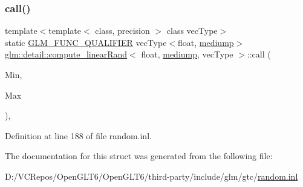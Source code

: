 \subsubsection{\texorpdfstring{call()}{call()}}
{\footnotesize\ttfamily template$<$template$<$ class, precision $>$ class vec\+Type$>$ \\
static \mbox{\hyperlink{setup_8hpp_a33fdea6f91c5f834105f7415e2a64407}{G\+L\+M\+\_\+\+F\+U\+N\+C\+\_\+\+Q\+U\+A\+L\+I\+F\+I\+ER}} vec\+Type$<$float, \mbox{\hyperlink{namespaceglm_a0f04f086094c747d227af4425893f545a6416f3ea0c9025fb21ed50c4d6620482}{mediump}}$>$ \mbox{\hyperlink{structglm_1_1detail_1_1compute__linear_rand}{glm\+::detail\+::compute\+\_\+linear\+Rand}}$<$ float, \mbox{\hyperlink{namespaceglm_a0f04f086094c747d227af4425893f545a6416f3ea0c9025fb21ed50c4d6620482}{mediump}}, vec\+Type $>$\+::call (\begin{DoxyParamCaption}\item[{vec\+Type$<$ float, \mbox{\hyperlink{namespaceglm_a0f04f086094c747d227af4425893f545a6416f3ea0c9025fb21ed50c4d6620482}{mediump}} $>$ const \&}]{Min,  }\item[{vec\+Type$<$ float, \mbox{\hyperlink{namespaceglm_a0f04f086094c747d227af4425893f545a6416f3ea0c9025fb21ed50c4d6620482}{mediump}} $>$ const \&}]{Max }\end{DoxyParamCaption})\hspace{0.3cm}{\ttfamily [inline]}, {\ttfamily [static]}}



Definition at line 188 of file random.\+inl.



The documentation for this struct was generated from the following file\+:\begin{DoxyCompactItemize}
\item 
D\+:/\+V\+C\+Repos/\+Open\+G\+L\+T6/\+Open\+G\+L\+T6/third-\/party/include/glm/gtc/\mbox{\hyperlink{random_8inl}{random.\+inl}}\end{DoxyCompactItemize}
